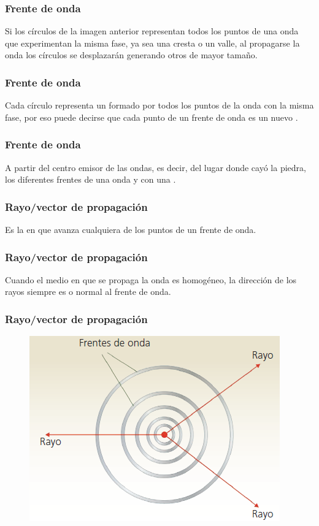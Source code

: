 \documentclass[14pt]{beamer}
\begin{document}
\begin{frame}
\frametitle{Frente de onda}
Si los círculos de la imagen anterior representan todos los puntos de una onda que experimentan la misma fase, \pause ya sea una cresta o un valle, \pause al propagarse la onda los círculos se desplazarán generando otros de mayor tamaño. 
\end{frame}
\begin{frame}
\frametitle{Frente de onda}
Cada círculo representa un  formado por todos los puntos de la onda con la misma fase, \pause por eso puede decirse que cada punto de un frente de onda es un nuevo .
\end{frame}
\begin{frame}
\frametitle{Frente de onda}
A partir del centro emisor de las ondas, es decir, del lugar donde cayó la piedra, los diferentes frentes de una onda  \pause y con una .
\end{frame}
\begin{frame}
\frametitle{Rayo/vector de propagación}
Es la  en que avanza cualquiera de los puntos de un frente de onda.
\end{frame}
\begin{frame}
\frametitle{Rayo/vector de propagación}
Cuando el medio en que se propaga la onda es homogéneo, la dirección de los rayos siempre es  o normal al frente de onda.
\end{frame}
\begin{frame}
\frametitle{Rayo/vector de propagación}
\begin{figure}
    \centering
    \includegraphics[scale=0.8]{Imagenes/Frente_Onda_01.png}
\end{figure}
\end{frame}
\end{document}
